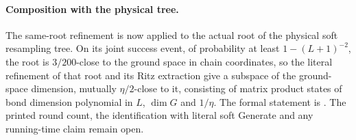 \documentclass{article}
\begin{document}
\paragraph{Composition with the physical tree.}
The same-root refinement is now applied to the actual root of the physical
soft resampling tree. On its joint success event, of probability at least
$1-(L+1)^{-2}$, the root is $3/200$-close to the ground space in chain
coordinates, so the literal refinement of that root and its Ritz extraction
give a subspace of the ground-space dimension, mutually $\eta/2$-close to it,
consisting of matrix product states of bond dimension polynomial in $L$,
$\dim G$ and $1/\eta$. The formal statement is
.
The printed round count, the identification with literal soft Generate and
any running-time claim remain open.



\end{document}

